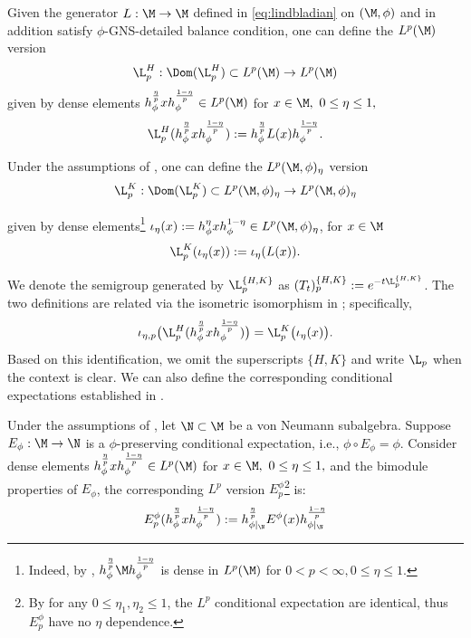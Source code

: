 \documentclass[sn-mathphys-num]{sn-jnl}
\begin{document}
\begin{definition}\label{def:lind-h-lp}
Given the generator $L:\M\to\M$ defined in \cref{eq:lindbladian} on $(\M,\phi)$ and in addition satisfy $\phi$-GNS-detailed balance condition, one can define the $L^p(\M)$ version
\[
    \L_p^H: \Dom(\L_p^H) \subset L^p(\M)\to L^p(\M)
\]
given by dense elements $h_\phi^{\frac \eta {p}}xh_\phi^{\frac {1-\eta} {p}}\in L^{p}(\M)$ for $x\in\M,\ 0\le\eta\le1,$
\[
    \L_p^H(h_\phi^{\frac \eta {p}}xh_\phi^{\frac {1-\eta} {p}}):=h_\phi^{\frac \eta {p}}L(x)h_\phi^{\frac {1-\eta} {p}}.
\]
\end{definition}
\begin{definition}\label{def:lind-k-lp}
Under the assumptions of , one can define the $L^p(\M,\phi)_\eta$ version
\[   \L_p^K: \Dom(\L_p^K) \subset L^p(\M,\phi)_\eta \to L^p(\M,\phi)_\eta\]

given by dense elements\footnote{Indeed, by \cite[Lemma~1.1]{Junge_Xu_2003}, $h_\phi^{\frac \eta p} \M h_\phi^{\frac{1-\eta}{p}}$ is dense in $L^p(\M)$ for $0<p<\infty, 0\le\eta\le1$.} $\displaystyle \iota_\eta(x):=h_\phi^\eta xh_\phi^{1-\eta}\in L^p(\M,\phi)_\eta$, for $x\in\M$
\[
    \L_p^K(\iota_\eta (x)):=\iota_\eta(L(x)).
\]
\end{definition}
We denote the semigroup generated by $\L_p^{\{H,K\}}$ as $(T_t)_p^{\{H,K\}} := e^{-t \L_p^{\{H,K\}}}$. The two definitions are related via the isometric isomorphism in ; specifically,
\[
    \iota_{\eta,p}\big( \L_p^H(h_\phi^{\frac{\eta}{p}} x h_\phi^{\frac{1-\eta}{p}}) \big)
    = \L_p^K\big( \iota_\eta(x) \big).
\]
Based on this identification, we omit the superscripts $\{H,K\}$ and write $\L_p$ when the context is clear.
We can also define the corresponding conditional expectations established in \cite[Section~2]{Junge_Xu_2003}.
\begin{definition}\label{def:E_p}
    Under the assumptions of , let $\N\subset \M$ be a von Neumann subalgebra.
Suppose $E_\phi:\M\to \N$ is a $\phi$-preserving conditional expectation, i.e., $\phi\circ E_\phi=\phi$. Consider dense elements $h_\phi^{\frac \eta {p}}xh_\phi^{\frac {1-\eta} {p}}\in L^{p}(\M)$ for $x\in\M,\ 0\le\eta\le1,$ and the bimodule properties of $E_\phi$, the corresponding $L^p$ version $E_p^\phi$\footnote{By \cite[Lemma~2.1]{Junge_Xu_2003} for any $0\leq\eta_1,\eta_2\leq 1$, the $L^p$ conditional expectation are identical, thus $E_p^\phi$ have no $\eta$ dependence.} is:
    \begin{equation}\label{eq:Ep}
        E_p^\phi(h_\phi^{\frac \eta {p}}xh_\phi^{\frac {1-\eta} {p}}):=h_{\phi|_\N}^{\frac \eta {p}}E^\phi(x)h_{\phi|_\N}^{\frac {1-\eta} {p}}
    \end{equation}
\end{definition}
\end{document}
